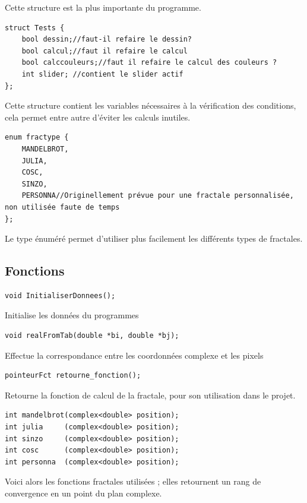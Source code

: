 \documentclass[a4paper,11pt]{article} \usepackage[T1]{fontenc} \usepackage[utf8]{inputenc} \usepackage[francais]{babel}
\begin{document}
Cette structure est la plus importante du programme.

\begin{lstlisting}
struct Tests {
    bool dessin;//faut-il refaire le dessin?
    bool calcul;//faut il refaire le calcul
    bool calccouleurs;//faut il refaire le calcul des couleurs ?
    int slider; //contient le slider actif
};\end{lstlisting}

Cette structure contient les variables nécessaires à la vérification des conditions, cela permet entre autre d’éviter les calculs inutiles.

\begin{lstlisting}
enum fractype {
    MANDELBROT,
    JULIA,
    COSC,
    SINZO,
    PERSONNA//Originellement prévue pour une fractale personnalisée, non utilisée faute de temps
};\end{lstlisting}

Le type énuméré permet d'utiliser plus facilement les différents types de fractales.\\

\subsection{Fonctions}
\begin{lstlisting}
void InitialiserDonnees(); \end{lstlisting}

Initialise les données du programmes

\begin{lstlisting}
void realFromTab(double *bi, double *bj);\end{lstlisting}

Effectue la correspondance entre les coordonnées complexe et les pixels

\begin{lstlisting}
pointeurFct retourne_fonction();\end{lstlisting}

Retourne la fonction de calcul de la fractale, pour son utilisation dans le projet. 

\begin{lstlisting}
int mandelbrot(complex<double> position);
int julia     (complex<double> position);
int sinzo     (complex<double> position);
int cosc      (complex<double> position);
int personna  (complex<double> position);\end{lstlisting}

Voici alors les fonctions fractales utilisées ; elles retournent un rang de convergence en un point du plan complexe.
\end{document}
